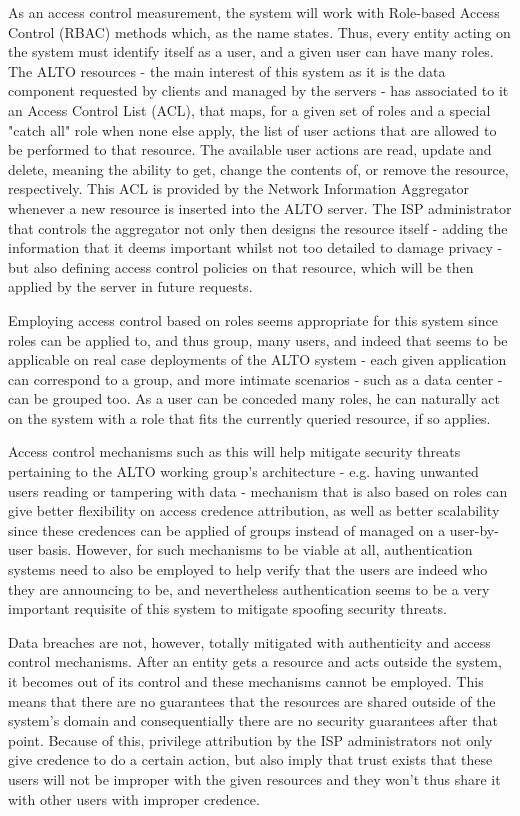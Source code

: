     As an access control measurement, the system will work with Role-based Access Control (RBAC) methods which, as the name states.
    Thus, every entity acting on the system must identify itself as a user, and a given user can have many roles.
    The ALTO resources - the main interest of this system as it is the data component requested by clients and managed by the servers - has associated to it an Access Control List (ACL), that maps, for a given set of roles and a special "catch all" role when none else apply, the list of user actions that are allowed to be performed to that resource.
    The available user actions are read, update and delete, meaning the ability to get, change the contents of, or remove the resource, respectively.
    This ACL is provided by the Network Information Aggregator whenever a new resource is inserted into the ALTO server.
    The ISP administrator that controls the aggregator not only then designs the resource itself - adding the information that it deems important whilst not too detailed to damage privacy - but also defining access control policies on that resource, which will be then applied by the server in future requests.

    Employing access control based on roles seems appropriate for this system since roles can be applied to, and thus group, many users, and indeed that seems to be applicable on real case deployments of the ALTO system - each given application can correspond to a group, and more intimate scenarios - such as a data center - can be grouped too.
    As a user can be conceded many roles, he can naturally act on the system with a role that fits the currently queried resource, if so applies.

    Access control mechanisms such as this will help mitigate security threats pertaining to the ALTO working group's architecture - e.g. having unwanted users reading or tampering with data - mechanism that is also based on roles can give better flexibility on access credence attribution, as well as better scalability since these credences can be applied of groups instead of managed on a user-by-user basis.
    However, for such mechanisms to be viable at all, authentication systems need to also be employed to help verify that the users are indeed who they are announcing to be, and nevertheless authentication seems to be a very important requisite of this system to mitigate spoofing security threats.

    Data breaches are not, however, totally mitigated with authenticity and access control mechanisms.
    After an entity gets a resource and acts outside the system, it becomes out of its control and these mechanisms cannot be employed.
    This means that there are no guarantees that the resources are shared outside of the system's domain and consequentially there are no security guarantees after that point.
    Because of this, privilege attribution by the ISP administrators not only give credence to do a certain action, but also imply that trust exists that these users will not be improper with the given resources and they won't thus share it with other users with improper credence.


